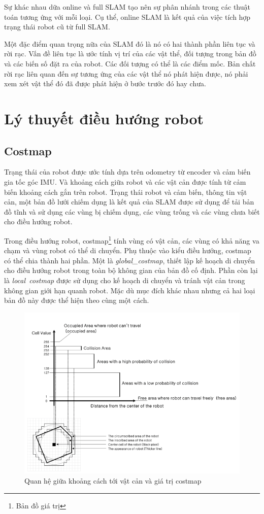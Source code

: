 {Sự khác nhau dữa online và full SLAM tạo nên sự phân nhánh trong các thuật toán tương ứng với mỗi loại. Cụ thể, online SLAM là kết quả của việc tích hợp trạng thái robot cũ từ full SLAM.

Một đặc điểm quan trọng nữa của SLAM đó là nó có hai thành phần liên tục và rời rạc. Vấn đề liên tục là ước tính vị trí của các vật thể, đối tượng trong bản đồ và các biến số đặt ra của robot. Các đối tượng có thể là các điểm mốc. Bản chất rời rạc liên quan đến sự tương ứng của các vật thể nó phát hiện được, nó phải xem xét vật thể đó đã được phát hiện ở bước trước đó hay chưa.


\section{Lý thuyết điều hướng robot}
\subsection{Costmap}

Trạng thái của robot được ước tính dựa trên odometry từ encoder và cảm biến gia tốc góc IMU. Và khoảng cách giữa robot và các vật cản được tính từ cảm biến khoảng cách gắn trên robot. Trạng thái robot và cảm biến, thông tin vật cản, một bản đồ lưới chiếm dụng là kết quả của SLAM được sử dụng để tải bản đồ tĩnh và sử dụng các vùng bị chiếm dụng, các vùng trống và các vùng chưa biết cho điều hướng robot.

Trong điều hướng robot, costmap\footnote{Bản đồ giá trị} tính vùng có vật cản, các vùng có khả năng va chạm và vùng robot có thể di chuyển. Phụ thuộc vào kiểu điều hướng, costmap có thể chia thành hai phần. Một là \textit{global\_costmap}, thiết lập kế hoạch di chuyển cho điều hướng robot trong toàn bộ không gian của bản đồ cố định. Phần còn lại là \textit{local\ costmap} được sử dụng cho kế hoạch di chuyển và tránh vật cản trong không gian giới hạn quanh robot. Mặc dù mục đích khác nhau nhưng cả hai loại bản đồ này được thể hiện theo cùng một cách.

\begin{figure}[htbp]
  \centering
  \includegraphics[width=0.8\linewidth]{figures/relationship-distanceToObstacle-vs-costmapValue.png}
  \caption{Quan hệ giữa khoảng cách tới vật cản và giá trị costmap}
  \label{fig:relationship-distanceToObstacle-vs-costmapValue}
\end{figure}

}
